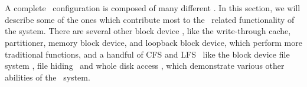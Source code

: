 \section{\Modules}
\label{sec:modules}

A complete \Kudos\ configuration is composed of many different \modules. In this
section, we will describe some of the ones which contribute most to the \chdesc\
related functionality of the system. There are several other block device
\modules, like the write-through cache, partitioner, memory block device, and
loopback block device, which perform more traditional functions, and a handful
of CFS and LFS \modules\ like the block device file system \module, file hiding
\module\, and whole disk access \module, which demonstrate various other
abilities of the \module\ system.




